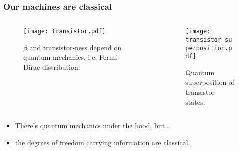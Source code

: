 \begin{frame}
\frametitle{Our machines are classical}
\begin{columns}
  \begin{column}{0.6\textwidth}
    \begin{figure}
    \texttt{[image: transistor.pdf]}
    \caption*{$\beta$ and transistor-ness depend on quantum mechanics, i.e. Fermi-Dirac distribution.}
    \end{figure}
  \end{column}
  \pause
  \begin{column}{0.4\textwidth}
    \begin{figure}
    \texttt{[image: transistor\_superposition.pdf]}
    \caption*{Quantum superposition of transistor states.}
    \end{figure}
  \end{column}
\end{columns}

\begin{itemize}
\item There's quantum mechanics under the hood, but...
\item the degrees of freedom carrying information are classical.

\end{itemize}
\end{frame}
